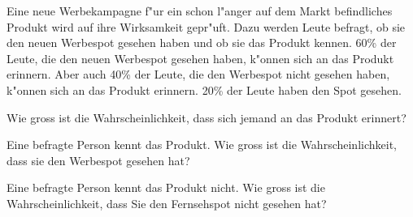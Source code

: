 Eine neue Werbekampagne f"ur ein schon l"anger auf dem Markt
befindliches Produkt wird auf ihre Wirksamkeit gepr"uft.
Dazu werden Leute befragt, ob sie den neuen Werbespot gesehen
haben und ob sie das Produkt kennen.
60\% der Leute, die den neuen Werbespot gesehen haben,
k"onnen sich an das Produkt erinnern. Aber auch 40\% der
Leute, die den Werbespot nicht gesehen haben, k"onnen sich
an das Produkt erinnern. 20\% der Leute haben den Spot gesehen.
\begin{teilaufgaben}
\item Wie gross ist die Wahrscheinlichkeit, dass sich jemand
an das Produkt erinnert?
\item Eine befragte Person kennt das Produkt. Wie gross ist
die Wahrscheinlichkeit, dass sie den Werbespot gesehen hat?
\item  Eine befragte Person kennt das Produkt nicht. Wie gross
ist die Wahrscheinlichkeit, dass Sie den Fernsehspot nicht
gesehen hat?
\end{teilaufgaben}

